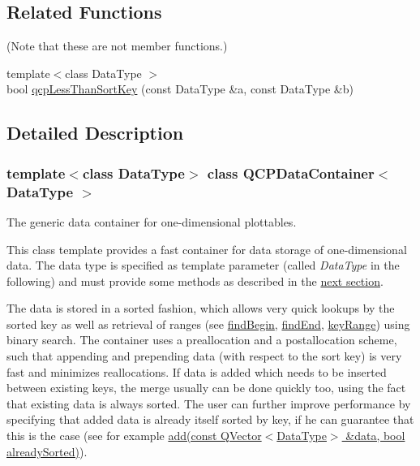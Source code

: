 \subsection*{Related Functions}
(Note that these are not member functions.) \begin{DoxyCompactItemize}
\item 
{\footnotesize template$<$class Data\+Type $>$ }\\bool \hyperlink{class_q_c_p_data_container_a74c5e06728cb6fa778a25d9ec0c4bd36}{qcp\+Less\+Than\+Sort\+Key} (const Data\+Type \&a, const Data\+Type \&b)
\end{DoxyCompactItemize}


\subsection{Detailed Description}
\subsubsection*{template$<$class Data\+Type$>$\newline
class Q\+C\+P\+Data\+Container$<$ Data\+Type $>$}

The generic data container for one-\/dimensional plottables. 

This class template provides a fast container for data storage of one-\/dimensional data. The data type is specified as template parameter (called {\itshape Data\+Type} in the following) and must provide some methods as described in the \hyperlink{class_q_c_p_data_container_qcpdatacontainer-datatype}{next section}.

The data is stored in a sorted fashion, which allows very quick lookups by the sorted key as well as retrieval of ranges (see \hyperlink{class_q_c_p_data_container_a2ad8a5399072d99a242d3a6d2d7e278a}{find\+Begin}, \hyperlink{class_q_c_p_data_container_afb8b8f23cc2b7234a793a25ce79fe48f}{find\+End}, \hyperlink{class_q_c_p_data_container_aba6e1a93c21ccc56a432b4a02c9d0ed2}{key\+Range}) using binary search. The container uses a preallocation and a postallocation scheme, such that appending and prepending data (with respect to the sort key) is very fast and minimizes reallocations. If data is added which needs to be inserted between existing keys, the merge usually can be done quickly too, using the fact that existing data is always sorted. The user can further improve performance by specifying that added data is already itself sorted by key, if he can guarantee that this is the case (see for example \hyperlink{class_q_c_p_data_container_a51d2a4c9ce4baf5e950b767d26673972}{add(const Q\+Vector$<$\+Data\+Type$>$ \&data, bool already\+Sorted)}).

